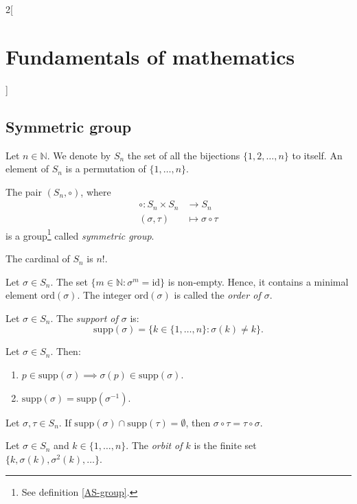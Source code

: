 \documentclass[../../../main.tex]{subfiles}
\begin{document}
\begin{multicols}{2}[\section{Fundamentals of mathematics}]
    \subsection{Symmetric group}
    \begin{definition}
        Let $n\in\mathbb{N}$. We denote by $S_n$ the set of all the bijections $\{1,2,\ldots,n\}$ to itself. An element of $S_n$ is a permutation of $\{1,\ldots,n\}$.
    \end{definition}
    \begin{prop}
        The pair $(S_n,\circ)$, where 
        \begin{align*}
            \circ:S_n\times S_n&\longrightarrow S_n\\
            (\sigma,\tau)&\longmapsto\sigma\circ\tau
        \end{align*}
        is a group\footnote{See definition \ref{AS-group}.} called \textit{symmetric group}.
    \end{prop}
    \begin{theorem}
        The cardinal of $S_n$ is $n!$.
    \end{theorem}
    \begin{definition}
        Let $\sigma\in S_n$. The set $\{m\in\mathbb{N}:\sigma^m=\text{id}\}$ is non-empty. Hence, it contains a minimal element $\text{ord}(\sigma)$. The integer $\text{ord}(\sigma)$ is called the \textit{order of $\sigma$}.
    \end{definition}
    \begin{definition}
        Let $\sigma\in S_n$. The \textit{support of $\sigma$} is: $$\text{supp}(\sigma)=\{k\in\{1,\ldots,n\}: \sigma(k)\ne k\}.$$
    \end{definition}
    \begin{lemma}
        Let $\sigma\in S_n$. Then:
        \begin{enumerate}
            \item $p\in\text{supp}(\sigma)\implies \sigma(p)\in\text{supp}(\sigma)$.
            \item $\text{supp}(\sigma)=\text{supp}(\sigma^{-1})$.
        \end{enumerate}
    \end{lemma}
    \begin{lemma}
        Let $\sigma,\tau\in S_n$. If $\text{supp}(\sigma)\cap\text{supp}(\tau)=\emptyset$, then $\sigma\circ \tau=\tau\circ \sigma$.
    \end{lemma}
    \begin{definition}
        Let $\sigma\in S_n$ and $k\in\{1,\ldots,n\}$. The \textit{orbit of $k$} is the finite set $\{k,\sigma(k),\sigma^2(k),\ldots\}$.

\end{definition}
\end{multicols}
\end{document}
